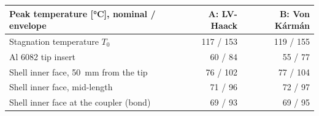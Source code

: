 \begin{tabular}{@{}lrr@{}}
\toprule
Peak temperature [\si{\celsius}], nominal / envelope & A: LV-Haack & B: Von K\'arm\'an \\
\midrule
Stagnation temperature $T_0$ & 117 / 153 & 119 / 155 \\
Al 6082 tip insert & 60 / 84 & 55 / 77 \\
Shell inner face, \SI{50}{mm} from the tip & 76 / 102 & 77 / 104 \\
Shell inner face, mid-length & 71 / 96 & 72 / 97 \\
Shell inner face at the coupler (bond) & 69 / 93 & 69 / 95 \\
\bottomrule
\end{tabular}
